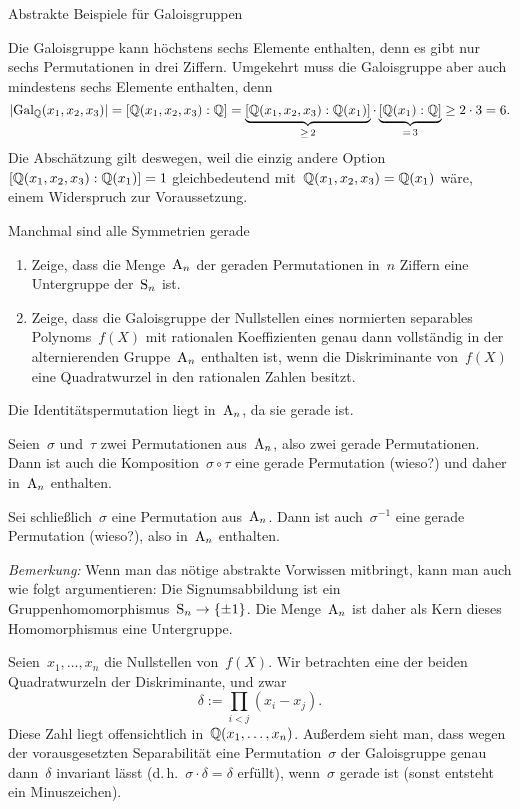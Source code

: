 \documentclass{algblatt}
\begin{document}
\begin{aufgabe}{Abstrakte Beispiele für Galoisgruppen}
\begin{loesungE}
\item Die Galoisgruppe kann höchstens sechs Elemente enthalten, denn es gibt
nur sechs Permutationen in drei Ziffern. Umgekehrt muss die Galoisgruppe aber
auch mindestens sechs Elemente enthalten, denn
\[ |\mathrm{Gal}_{\mathbb{Q}}(x_1,x_2,x_3)| = [\mathbb{Q}(x_1,x_2,x_3):\mathbb{Q}] =
  \underbrace{[\mathbb{Q}(x_1,x_2,x_3):\mathbb{Q}(x_1)]}_{\geq\,2} \cdot
  \underbrace{[\mathbb{Q}(x_1):\mathbb{Q}]}_{=\,3} \geq
  2 \cdot 3 = 6. \]
Die Abschätzung gilt deswegen, weil die einzig andere
Option~$[\mathbb{Q}(x_1,x_2,x_3):\mathbb{Q}(x_1)] = 1$ gleichbedeutend
mit~$\mathbb{Q}(x_1,x_2,x_3) = \mathbb{Q}(x_1)$ wäre, einem Widerspruch zur Voraussetzung.
\end{loesungE}
\end{aufgabe}

\ifloesungen\newpage\fi
\begin{aufgabe}{Manchmal sind alle Symmetrien gerade}
\begin{enumerate}
\item Zeige, dass die Menge~$\mathrm{A}_n$ der geraden Permutationen in~$n$ Ziffern eine
Untergruppe der~$\mathrm{S}_n$ ist.

\item Zeige, dass die Galoisgruppe der Nullstellen eines normierten separables
Polynoms~$f(X)$ mit rationalen Koeffizienten genau dann vollständig in der
alternierenden Gruppe~$\mathrm{A}_n$ enthalten ist, wenn die Diskriminante von~$f(X)$
eine Quadratwurzel in den rationalen Zahlen besitzt.
\end{enumerate}

\begin{loesungE}
\item Die Identitätspermutation liegt in~$\mathrm{A}_n$, da sie gerade ist.

Seien~$\sigma$ und~$\tau$ zwei Permutationen aus~$\mathrm{A}_n$, also zwei gerade
Permutationen. Dann ist auch die Komposition~$\sigma \circ \tau$ eine gerade
Permutation (wieso?) und daher in~$\mathrm{A}_n$ enthalten.

Sei schließlich~$\sigma$ eine Permutation aus~$\mathrm{A}_n$. Dann ist
auch~$\sigma^{-1}$ eine gerade Permutation (wieso?), also in~$\mathrm{A}_n$ enthalten.

\emph{Bemerkung:} Wenn man das nötige abstrakte Vorwissen mitbringt, kann man
auch wie folgt argumentieren: Die Signumsabbildung ist ein
Gruppenhomomorphismus~$\mathrm{S}_n \to \{ \pm1 \}$. Die Menge~$\mathrm{A}_n$ ist daher als Kern
dieses Homomorphismus eine Untergruppe.

\item Seien~$x_1, \ldots, x_n$ die Nullstellen von~$f(X)$. Wir betrachten eine
der beiden Quadratwurzeln der Diskriminante, und zwar
\[ \delta := \prod_{i < j} (x_i - x_j). \]
Diese Zahl liegt offensichtlich in~$\mathbb{Q}(x_1,\ldots,x_n)$. Außerdem sieht man,
dass wegen der vorausgesetzten Separabilität eine Permutation~$\sigma$ der
Galoisgruppe genau dann~$\delta$ invariant lässt (d.\,h.~$\sigma \cdot \delta =
\delta$ erfüllt), wenn~$\sigma$ gerade ist (sonst entsteht ein Minuszeichen).


\end{loesungE}
\end{aufgabe}
\end{document}
